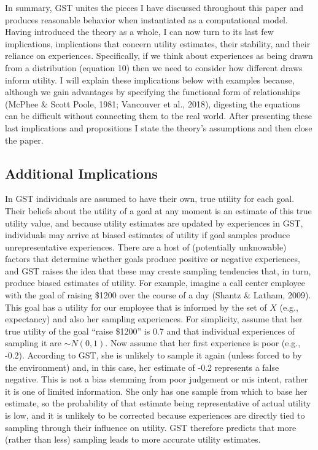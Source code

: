 \documentclass[english,man]{apa6}
\theoremstyle{definition}
\theoremstyle{definition}
\theoremstyle{definition}
\theoremstyle{remark}
\begin{document}
In summary, GST unites the pieces I have discussed throughout this paper
and produces reasonable behavior when instantiated as a computational
model. Having introduced the theory as a whole, I can now turn to its
last few implications, implications that concern utility estimates,
their stability, and their reliance on experiences. Specifically, if we
think about experiences as being drawn from a distribution (equation 10)
then we need to consider how different draws inform utility. I will
explain these implications below with examples because, although we gain
advantages by specifying the functional form of relationships (McPhee \&
Scott Poole, 1981; Vancouver et al., 2018), digesting the equations can
be difficult without connecting them to the real world. After presenting
these last implications and propositions I state the theory's
assumptions and then close the paper.

\subsection{Additional Implications}\label{additional-implications}

In GST individuals are assumed to have their own, true utility for each
goal. Their beliefs about the utility of a goal at any moment is an
estimate of this true utility value, and because utility estimates are
updated by experiences in GST, individuals may arrive at biased
estimates of utility if goal samples produce unrepresentative
experiences. There are a host of (potentially unknowable) factors that
determine whether goals produce positive or negative experiences, and
GST raises the idea that these may create sampling tendencies that, in
turn, produce biased estimates of utility. For example, imagine a call
center employee with the goal of raising \$1200 over the course of a day
(Shantz \& Latham, 2009). This goal has a utility for our employee that
is informed by the set of \(X\) (e.g., expectancy) and also her sampling
experiences. For simplicity, assume that her true utility of the goal
\enquote{raise \$1200} is 0.7 and that individual experiences of
sampling it are \(\sim {N}(0,1)\). Now assume that her first experience
is poor (e.g., -0.2). According to GST, she is unlikely to sample it
again (unless forced to by the environment) and, in this case, her
estimate of -0.2 represents a false negative. This is not a bias
stemming from poor judgement or mis intent, rather it is one of limited
information. She only has one sample from which to base her estimate, so
the probability of that estimate being representative of actual utility
is low, and it is unlikely to be corrected because experiences are
directly tied to sampling through their influence on utility. GST
therefore predicts that more (rather than less) sampling leads to more
accurate utility estimates.
\end{document}
